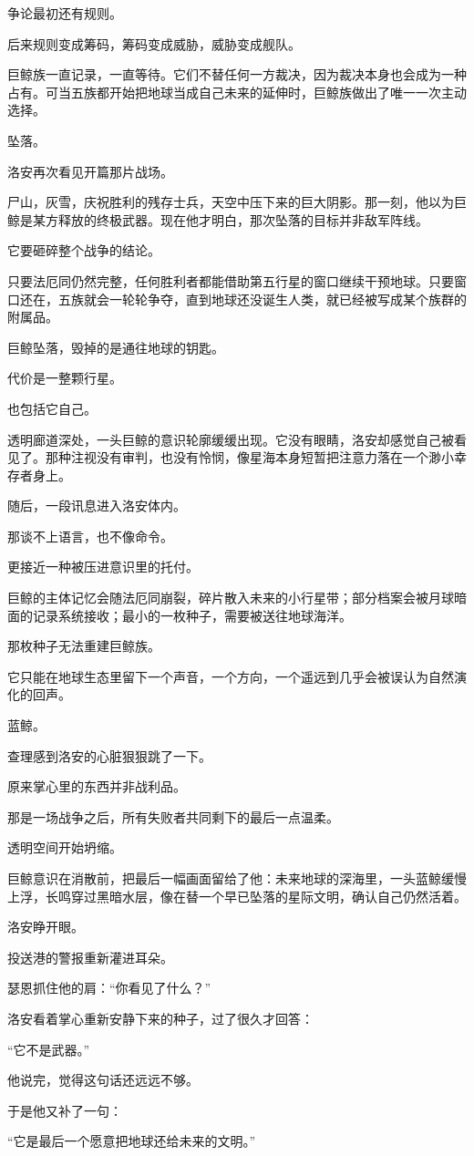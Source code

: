 争论最初还有规则。

后来规则变成筹码，筹码变成威胁，威胁变成舰队。

巨鲸族一直记录，一直等待。它们不替任何一方裁决，因为裁决本身也会成为一种占有。可当五族都开始把地球当成自己未来的延伸时，巨鲸族做出了唯一一次主动选择。

坠落。

洛安再次看见开篇那片战场。

尸山，灰雪，庆祝胜利的残存士兵，天空中压下来的巨大阴影。那一刻，他以为巨鲸是某方释放的终极武器。现在他才明白，那次坠落的目标并非敌军阵线。

它要砸碎整个战争的结论。

只要法厄同仍然完整，任何胜利者都能借助第五行星的窗口继续干预地球。只要窗口还在，五族就会一轮轮争夺，直到地球还没诞生人类，就已经被写成某个族群的附属品。

巨鲸坠落，毁掉的是通往地球的钥匙。

代价是一整颗行星。

也包括它自己。

透明廊道深处，一头巨鲸的意识轮廓缓缓出现。它没有眼睛，洛安却感觉自己被看见了。那种注视没有审判，也没有怜悯，像星海本身短暂把注意力落在一个渺小幸存者身上。

随后，一段讯息进入洛安体内。

那谈不上语言，也不像命令。

更接近一种被压进意识里的托付。

巨鲸的主体记忆会随法厄同崩裂，碎片散入未来的小行星带；部分档案会被月球暗面的记录系统接收；最小的一枚种子，需要被送往地球海洋。

那枚种子无法重建巨鲸族。

它只能在地球生态里留下一个声音，一个方向，一个遥远到几乎会被误认为自然演化的回声。

蓝鲸。

查理感到洛安的心脏狠狠跳了一下。

原来掌心里的东西并非战利品。

那是一场战争之后，所有失败者共同剩下的最后一点温柔。

透明空间开始坍缩。

巨鲸意识在消散前，把最后一幅画面留给了他：未来地球的深海里，一头蓝鲸缓慢上浮，长鸣穿过黑暗水层，像在替一个早已坠落的星际文明，确认自己仍然活着。

洛安睁开眼。

投送港的警报重新灌进耳朵。

瑟恩抓住他的肩：“你看见了什么？”

洛安看着掌心重新安静下来的种子，过了很久才回答：

“它不是武器。”

他说完，觉得这句话还远远不够。

于是他又补了一句：

“它是最后一个愿意把地球还给未来的文明。”

